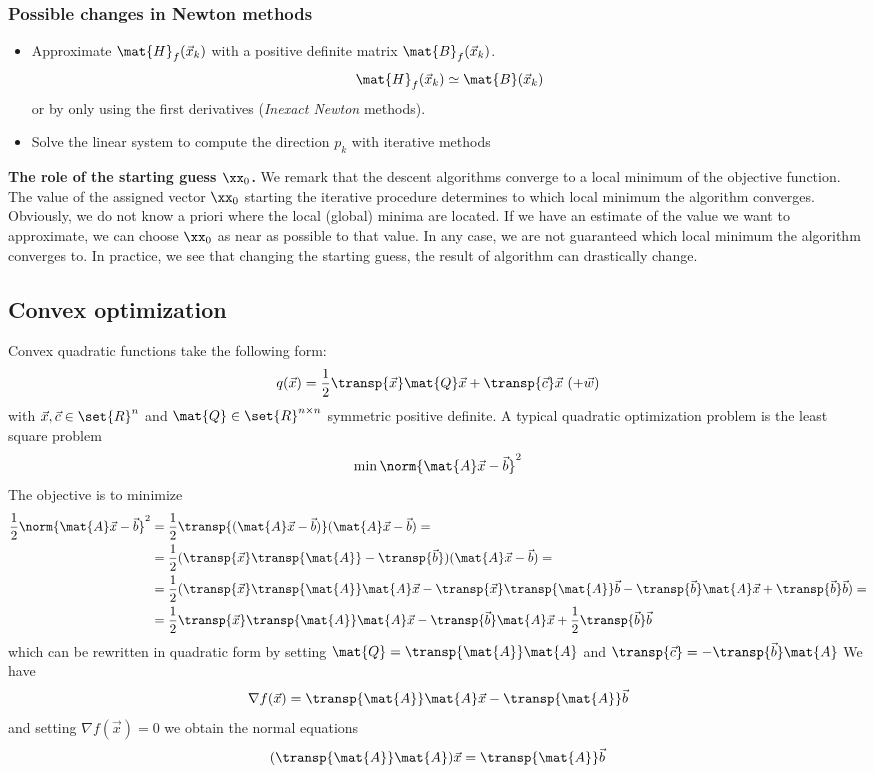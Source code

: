 \subsubsection{Possible changes in Newton methods}

\begin{itemize}
    \item 
 Approximate 
$\mat{H}_f(\vec{x}_k)$ with a positive definite matrix $\mat{B}_f(\vec{x}_k)$.
$$ \mat{H}_f(\vec{x}_k) \simeq \mat{B}(\vec{x}_k) $$ or by only using the first derivatives (\textit{Inexact Newton} methods).
\item Solve the linear system to compute the direction $p_k$ with iterative methods
\end{itemize}

\textbf{The role of the starting guess $\xx_0$.} We remark that the descent algorithms converge to a local minimum of the objective function. The value of the assigned vector $\xx_0$ starting the iterative procedure determines to which local minimum the algorithm converges. Obviously, we do not know a priori where the local (global) minima are located. If we have an estimate of the value we want to approximate, we can choose $\xx_0$ as near as possible to that value. In any case, we are not guaranteed which local minimum the algorithm converges to. In practice, we see that changing the starting guess, the result of algorithm can drastically change.

\subsection{Convex optimization}
Convex quadratic functions take the following form:
$$ q(\vec{x}) = \frac{1}{2}\transp{\vec{x}}\mat{Q}\vec{x} + \transp{\vec{c}}\vec{x}\ (+ \vec{w}) $$
with $\vec{x}, \vec{c} \in \set{R}^n$ and $\mat{Q} \in \set{R}^{n \times n}$ symmetric positive definite. A typical quadratic optimization problem is the least square problem
$$ \min{\norm{\mat{A}\vec{x} - \vec{b}}^2} $$
The objective is to minimize
$$
    \begin{aligned}
        \frac{1}{2}\norm{\mat{A}\vec{x} - \vec{b}}^2 &= \frac{1}{2}\transp{(\mat{A}\vec{x} - \vec{b})}(\mat{A}\vec{x} - \vec{b}) =\\
        &= \frac{1}{2}(\transp{\vec{x}}\transp{\mat{A}} - \transp{\vec{b}})(\mat{A}\vec{x} - \vec{b}) =\\
        &= \frac{1}{2}(\transp{\vec{x}}\transp{\mat{A}}\mat{A}\vec{x} - \transp{\vec{x}}\transp{\mat{A}}\vec{b} - \transp{\vec{b}}\mat{A}\vec{x} + \transp{\vec{b}}\vec{b}) =\\
        &= \frac{1}{2}\transp{\vec{x}}\transp{\mat{A}}\mat{A}\vec{x} - \transp{\vec{b}}\mat{A}\vec{x} + \frac{1}{2}\transp{\vec{b}}\vec{b}
    \end{aligned}
$$
which can be rewritten in quadratic form by setting $\mat{Q} = \transp{\mat{A}}\mat{A}$ and $\transp{\vec{c}} = -\transp{\vec{b}}\mat{A}$
We have
$$ \nabla{f}(\vec{x}) = \transp{\mat{A}}\mat{A}\vec{x} - \transp{\mat{A}}\vec{b}$$
and setting $\nabla{f}(\vec{x}) = 0$ we obtain the normal equations
$$ (\transp{\mat{A}}\mat{A})\vec{x} = \transp{\mat{A}}\vec{b} $$

